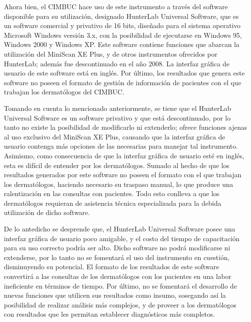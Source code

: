 Ahora bien, el CIMBUC hace uso de este instrumento a trav\'{e}s del software disponible para su utilizaci\'{o}n, designado HunterLab Universal Software, que es un software comercial y privativo de 16 bits, dise\~{n}ado para el sistema operativo Microsoft Windows versi\'{o}n 3.x, con la posibilidad de ejecutarse en Windows 95, Windows 2000 y Windows XP. Este software contiene funciones que abarcan la utilizaci\'{o}n del MiniScan XE Plus, y de otros instrumentos ofrecidos por HunterLab; adem\'{a}s fue descontinuado en el a\~{n}o 2008. La interfaz gr\'{a}fica de usuario de este software est\'{a} en ingl\'{e}s. Por \'{u}ltimo, los resultados que genera este software no poseen el formato de gesti\'{o}n de informaci\'{o}n de pacientes con el que trabajan los dermat\'{o}logos del CIMBUC.

Tomando en cuenta lo mencionado anteriormente, se tiene que el HunterLab Universal Software es un software privativo y que est\'{a} descontinuado, por lo tanto no existe la posibilidad de modificarlo ni extenderlo; ofrece funciones ajenas al uso exclusivo del MiniScan XE Plus, causando que la interfaz gr\'{a}fica de usuario contenga m\'{a}s opciones de las necesarias para manejar tal instrumento. Asimismo, como consecuencia de que la interfaz gr\'{a}fica de usuario est\'{e} en ingl\'{e}s, esta es dif\'{i}cil de entender por los dermat\'{o}logos. Sumado al hecho de que los resultados generados por este software no poseen el formato con el que trabajan los dermat\'{o}logos, haciendo necesario su traspaso manual, lo que produce una ralentizaci\'{o}n en las consultas con pacientes. Todo esto conlleva a que los dermat\'{o}logos requieran de asistencia t\'{e}cnica especializada para la debida utilizaci\'{o}n de dicho software.

De lo antedicho se desprende que, el HunterLab Universal Software posee una interfaz gr\'{a}fica de usuario poco amigable, y el costo del tiempo de capacitaci\'{o}n para su uso correcto podr\'{i}a ser alto. Dicho software no podr\'{a} modificarse ni extenderse, por lo tanto no se fomentar\'{a} el uso del instrumento en cuesti\'{o}n, disminuyendo su potencial. El formato de los resultados de este software convertir\'{a} a las consultas de los dermat\'{o}logos con los pacientes en una labor ineficiente en t\'{e}rminos de tiempo. Por \'{u}ltimo, no se fomentar\'{a} el desarrollo de nuevas funciones que utilicen sus resultados como insumo, sosegando as\'{i} la posibilidad de realizar an\'{a}lisis m\'{a}s complejos, y de proveer a los dermat\'{o}logos con resultados que les permitan establecer diagn\'{o}sticos m\'{a}s completos.

